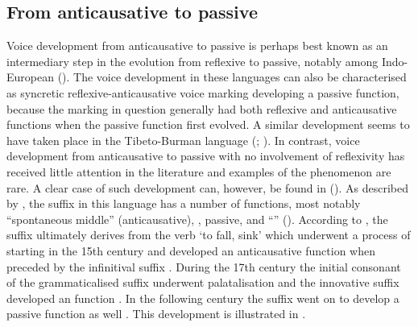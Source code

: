 \subsection{From anticausative to passive} \label{diachrony:antc2pass}
Voice development from anticausative to passive is perhaps best known as an intermediary step in the evolution from reflexive to passive, notably among Indo-European (). The voice development in these languages can also be characterised as syncretic reflexive-anticausative voice marking developing a passive function, because the marking in question generally had both reflexive and anticausative functions when the passive function first evolved. A similar development seems to have taken place in the Tibeto-Burman language  (; ). In contrast, voice development from anticausative to passive with no involvement of reflexivity has received little attention in the literature and examples of the phenomenon are rare. A clear case of such development can, however, be found in  (). As described by \cite{ahn:yap:2017}, the suffix  in this language has a number of functions, most notably “spontaneous middle” (anticausative), , passive, and “” (). According to \cite[444ff.]{ahn:yap:2017}, the suffix ultimately derives from the verb  ‘to fall, sink’ which underwent a process of  starting in the 15th century and developed an anticausative function when preceded by the infinitival suffix . During the 17th century the initial consonant of the grammaticalised suffix  underwent palatalisation and the innovative suffix  developed an  function \citep[446ff.]{ahn:yap:2017}. In the following century the suffix went on to develop a passive function as well \citep[451ff.]{ahn:yap:2017}. This development is illustrated in . 

